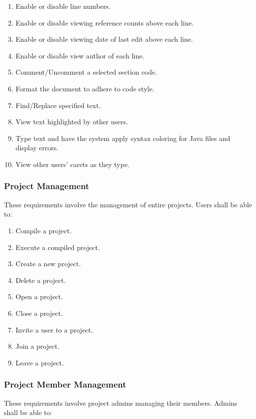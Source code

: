 \documentclass[twoside,letterpaper]{article}
\begin{document}
{\begin{enumerate}
	\item Enable or disable line numbers.
	\item Enable or disable viewing reference counts above each line.
	\item Enable or disable viewing date of last edit above each line.
	\item Enable or disable view author of each line.
	\item Comment/Uncomment a selected section code.
	\item Format the document to adhere to code style.
	\item Find/Replace specified text.
	\item View text highlighted by other users.
	\item Type text and have the system apply syntax coloring for Java files and display errors.
	\item View other users' carets as they type.
\end{enumerate}

\subsubsection{Project Management}

These requirements involve the management of entire projects. Users shall be able to:

\begin{enumerate}
	\item Compile a project.
	\item Execute a compiled project.
	\item Create a new project.
	\item Delete a project.
	\item Open a project.
	\item Close a project.
	\item Invite a user to a project.
	\item Join a project.
	\item Leave a project.
\end{enumerate}

\subsubsection{Project Member Management}

These requirements involve project admins managing their members. Admins shall be able to:

}
\end{document}

